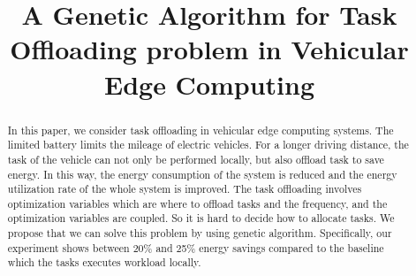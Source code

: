 \documentclass[conference]{IEEEtran}
\begin{document}
	
	
	\title{A Genetic Algorithm for Task Offloading problem in Vehicular Edge Computing\\
	}
	\author{
		\and
		\and
	}
	
	\maketitle
	
	\begin{abstract}
		In this paper, we consider task offloading in vehicular edge computing systems. 
		The limited battery limits the mileage of electric vehicles. 
		For a longer driving distance, the task of the vehicle can not only be performed locally, but also offload  task to save energy. 
		In this way, the energy consumption of the system is reduced and the energy utilization rate of the whole system is improved. 
		The task offloading involves optimization variables which are where to offload tasks and the frequency, and the optimization variables are coupled. 
		So it is hard to decide how to allocate tasks. 
		We propose that we can solve this problem by using genetic algorithm. 
		Specifically, our experiment shows between 20\% and 25\% energy savings compared to the baseline which the tasks executes workload locally. 
	\end{abstract}
	
\end{document}
